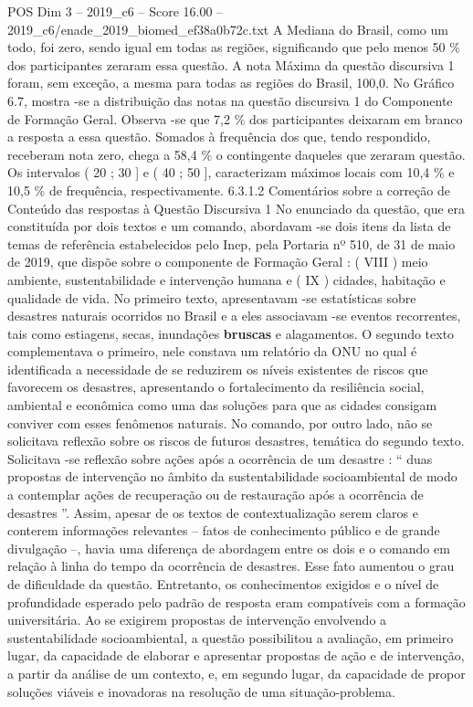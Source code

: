 \begin{textsample}{POS Dim 3 – 2019\_c6 – Score 16.00 – 2019\_c6/enade\_2019\_biomed\_ef38a0b72c.txt}
A Mediana do Brasil, como um todo, foi zero, sendo igual em todas as regiões, significando que pelo menos 50 \% dos participantes zeraram essa questão.
A nota Máxima da questão discursiva 1 foram, sem exceção, a mesma para todas as regiões do Brasil, 100,0.
No Gráfico 6.7, mostra -se a distribuição das notas na questão discursiva 1 do Componente de Formação Geral.
Observa -se que 7,2 \% dos participantes deixaram em branco a resposta a essa questão.
Somados à frequência dos que, tendo respondido, receberam nota zero, chega a 58,4 \% o contingente daqueles que zeraram questão.
Os intervalos ( 20 ; 30 ] e ( 40 ; 50 ], caracterizam máximos locais com 10,4 \% e 10,5 \% de frequência, respectivamente. 6.3.1.2 Comentários sobre a correção de Conteúdo das respostas à Questão Discursiva 1 No enunciado da questão, que era constituída por dois textos e um comando, abordavam -se dois itens da lista de temas de referência estabelecidos pelo Inep, pela Portaria nº 510, de 31 de maio de 2019, que dispõe sobre o componente de Formação Geral : ( VIII ) meio ambiente, sustentabilidade e intervenção humana e ( IX ) cidades, habitação e qualidade de vida.
No primeiro texto, apresentavam -se estatísticas sobre desastres naturais ocorridos no Brasil e a eles associavam -se eventos recorrentes, tais como estiagens, secas, inundações \textbf{bruscas} e alagamentos.
O segundo texto complementava o primeiro, nele constava um relatório da ONU no qual é identificada a necessidade de se reduzirem os níveis existentes de riscos que favorecem os desastres, apresentando o fortalecimento da resiliência social, ambiental e econômica como uma das soluções para que as cidades consigam conviver com esses fenômenos naturais.
No comando, por outro lado, não se solicitava reflexão sobre os riscos de futuros desastres, temática do segundo texto.
Solicitava -se reflexão sobre ações após a ocorrência de um desastre : “ duas propostas de intervenção no âmbito da sustentabilidade socioambiental de modo a contemplar ações de recuperação ou de restauração após a ocorrência de desastres ”.
Assim, apesar de os textos de contextualização serem claros e conterem informações relevantes – fatos de conhecimento público e de grande divulgação –, havia uma diferença de abordagem entre os dois e o comando em relação à linha do tempo da ocorrência de desastres.
Esse fato aumentou o grau de dificuldade da questão.
Entretanto, os conhecimentos exigidos e o nível de profundidade esperado pelo padrão de resposta eram compatíveis com a formação universitária.
Ao se exigirem propostas de intervenção envolvendo a sustentabilidade socioambiental, a questão possibilitou a avaliação, em primeiro lugar, da capacidade de elaborar e apresentar propostas de ação e de intervenção, a partir da análise de um contexto, e, em segundo lugar, da capacidade de propor soluções viáveis e inovadoras na resolução de uma situação-problema.

\end{textsample}
